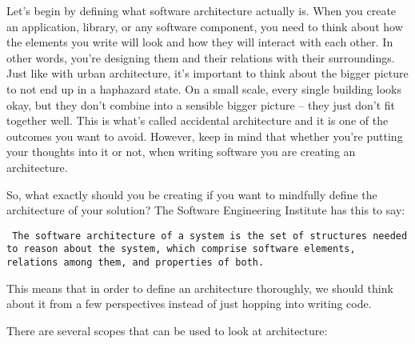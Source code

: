 Let's begin by defining what software architecture actually is. When you create an application, library, or any software component, you need to think about how the elements you write will look and how they will interact with each other. In other words, you're designing them and their relations with their surroundings. Just like with urban architecture, it's important to think about the bigger picture to not end up in a haphazard state. On a small scale, every single building looks okay, but they don't combine into a sensible bigger picture – they just don't fit together well. This is what's called accidental architecture and it is one of the outcomes you want to avoid. However, keep in mind that whether you're putting your thoughts into it or not, when writing software you are creating an architecture.


So, what exactly should you be creating if you want to mindfully define the architecture of your solution? The Software Engineering Institute has this to say:

\begin{center}
\tt
The software architecture of a system is the set of structures needed to reason about the system, which comprise software elements, relations among them, and properties of both.
\end{center}

This means that in order to define an architecture thoroughly, we should think about it from a few perspectives instead of just hopping into writing code.


There are several scopes that can be used to look at architecture:

